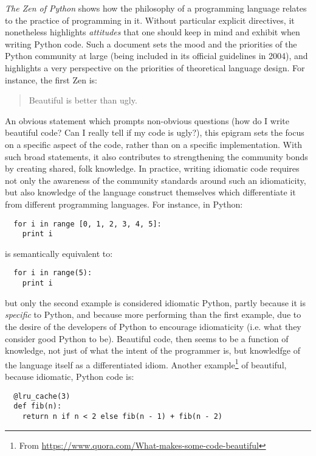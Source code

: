 \documentclass{article}
\begin{document}
\emph{The Zen of Python} shows how the philosophy of a programming language relates to the practice of programming in it. Without particular explicit directives, it nonetheless highlights \emph{attitudes} that one should keep in mind and exhibit when writing Python code. Such a document sets the mood and the priorities of the Python community at large (being included in its official guidelines in 2004), and highlights a very perspective on the priorities of theoretical language design. For instance, the first Zen is:

\begin{quote}
  Beautiful is better than ugly.
\end{quote}

An obvious statement which prompts non-obvious questions (how do I write beautiful code? Can I really tell if my code is ugly?), this epigram sets the focus on a specific aspect of the code, rather than on a specific implementation. With such broad statements, it also contributes to strengthening the community bonds by creating shared, folk knowledge. In practice, writing idiomatic code requires not only the awareness of the community standards around such an idiomaticity, but also knowledge of the language construct themselves which differentiate it from different programming languages. For instance, in Python:

\begin{lstlisting}
  for i in range [0, 1, 2, 3, 4, 5]:
    print i
\end{lstlisting}

is semantically equivalent to:

\begin{lstlisting}
  for i in range(5):
    print i
\end{lstlisting}

but only the second example is considered idiomatic Python, partly because it is \emph{specific} to Python, and because more performing than the first example, due to the desire of the developers of Python to encourage idiomaticity (i.e. what they consider good Python to be). Beautiful code, then seems to be a function of knowledge, not just of what the intent of the programmer is, but knowledfge of the language itself as a differentiated idiom. Another example\footnote{From \url{https://www.quora.com/What-makes-some-code-beautiful}} of beautiful, because idiomatic, Python code is:

\begin{lstlisting}
  @lru_cache(3)
  def fib(n):
    return n if n < 2 else fib(n - 1) + fib(n - 2)
\end{lstlisting}
\end{document}
